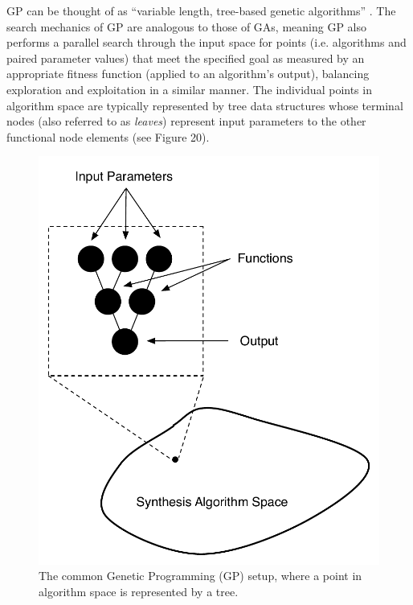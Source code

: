 \documentclass[12pt]{report} 	%
\numberwithin{figure}{chapter}
\numberwithin{table}{chapter}
\numberwithin{equation}{chapter}
\begin{document}
\begin{flushleft}
GP can be thought of as ``variable length, tree-based genetic algorithms'' \cite[p. 29]{Teller:1998ly}. The search mechanics of GP are analogous to those of GAs, meaning GP also performs a parallel search through the input space for points (i.e. algorithms and paired parameter values) that meet the specified goal as measured by an appropriate fitness function (applied to an algorithm's output), balancing exploration and exploitation in a similar manner. The individual points in algorithm space are typically represented by tree data structures whose terminal nodes (also referred to as \textit{leaves}) represent input parameters to the other functional node elements (see Figure 20). 
\begin{figure}[h!]
\vspace{24pt}
\begin{center}
\includegraphics[scale=0.70]{GraphAsPoint}
\caption[The genetic programming paradigm]{The common Genetic Programming (GP) setup, where a point in algorithm space is represented by a tree.}
\end{center}
\vspace{6pt}
\end{figure}

\end{flushleft}
\end{document}
